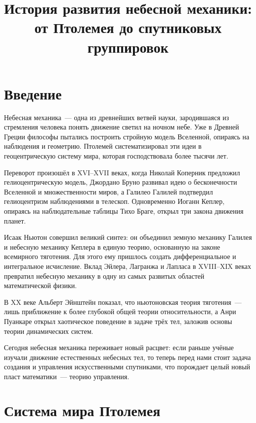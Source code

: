\documentclass[12pt,a4paper]{article}
\title{История развития небесной механики: от Птолемея до спутниковых группировок}
\author{}
\date{}
\begin{document}
\maketitle
\tableofcontents
\newpage

\section{Введение}

Небесная механика~--- одна из древнейших ветвей науки, зародившаяся из
стремления человека понять движение светил на ночном небе. Уже в Древней
Греции философы пытались построить стройную модель Вселенной, опираясь на
наблюдения и геометрию. Птолемей систематизировал эти идеи в геоцентрическую
систему мира, которая господствовала более тысячи лет.

Переворот произошёл в XVI--XVII веках, когда Николай Коперник предложил
гелиоцентрическую модель, Джордано Бруно развивал идею о бесконечности
Вселенной и множественности миров, а Галилео Галилей подтвердил
гелиоцентризм наблюдениями в телескоп. Одновременно Иоганн Кеплер, опираясь
на наблюдательные таблицы Тихо Браге, открыл три закона движения планет.

Исаак Ньютон совершил великий синтез: он объединил земную механику Галилея и
небесную механику Кеплера в единую теорию, основанную на законе всемирного
тяготения. Для этого ему пришлось создать дифференциальное и интегральное
исчисление. Вклад Эйлера, Лагранжа и Лапласа в XVIII--XIX веках превратил
небесную механику в одну из самых развитых областей математической физики.

В XX веке Альберт Эйнштейн показал, что ньютоновская теория тяготения~---
лишь приближение к более глубокой общей теории относительности, а Анри
Пуанкаре открыл хаотическое поведение в задаче трёх тел, заложив основы
теории динамических систем.

Сегодня небесная механика переживает новый расцвет: если раньше учёные
изучали движение естественных небесных тел, то теперь перед нами стоит задача
создания и управления искусственными спутниками, что порождает целый новый
пласт математики~--- теорию управления.

\section{Система мира Птолемея}
\end{document}
